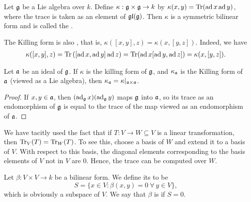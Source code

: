 \begin{definition}
    Let $\mathfrak{g}$ be a Lie algebra over $k$. Define $\kappa:\mathfrak{g}\times\mathfrak{g}\to k$ by $\kappa(x, y) = \operatorname{Tr}(\operatorname{ad} x\operatorname{ad} y)$, where the trace is taken as an element of $\mathfrak{gl}(\mathfrak{g})$. Then $\kappa$ is a symmetric bilinear form and is called the .
\end{definition}

\begin{remark}
    The Killing form is also , that is, $\kappa([x, y], z) = \kappa(x, [y, z])$. Indeed, we have 
    \begin{align*}
        \kappa([x, y], z) = \operatorname{Tr}\left([\operatorname{ad} x, \operatorname{ad} y]\operatorname{ad} z\right) = \operatorname{Tr}(\operatorname{ad} x[\operatorname{ad} y,\operatorname{ad} z]) = \kappa(x, [y, z]).
    \end{align*}
\end{remark}

\begin{lemma}
    Let $\mathfrak{a}$ be an ideal of $\mathfrak{g}$. If $\kappa$ is the killing form of $\mathfrak{g}$, and $\kappa_{\mathfrak{a}}$ is the Killing form of $\mathfrak{a}$ (viewed as a Lie algebra), then $\kappa_{\mathfrak{a}} = \kappa|_{\mathfrak{a}\times\mathfrak{a}}$.
\end{lemma}
\begin{proof}
    If $x,y\in\mathfrak{a}$, then $(\operatorname{ad}_{\mathfrak{g}} x)(\operatorname{ad}_{\mathfrak{g}} y)$ maps $\mathfrak{g}$ into $\mathfrak{a}$, so its trace as an endomorphism of $\mathfrak{g}$ is equal to the trace of the map viewed as an endomorphism of $\mathfrak{a}$. 
\end{proof}

\begin{remark}
    We have tacitly used the fact that if $T: V\to W\subseteq V$ is a linear transformation, then $\operatorname{Tr}_V(T) = \operatorname{Tr}_W(T)$. To see this, choose a basis of $W$ and extend it to a basis of $V$. With respect to this basis, the diagonal elements corresponding to the basis elements of $V$ not in $V$ are $0$. Hence, the trace can be computed over $W$.
\end{remark}

\begin{definition}
    Let $\beta: V\times V\to k$ be a bilinear form. We define its  to be 
    \begin{equation*}
        S = \{x\in V\colon \beta(x, y) = 0~\forall~y\in V\},
    \end{equation*}
    which is obviously a subspace of $V$. We say that $\beta$ is  if $S = 0$.
\end{definition}

